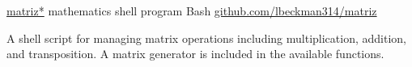 \showoff
{\href{https://liambeckman.com/code/matriz}{matriz*}}
{mathematics shell program}
{Bash}
{\href{https://github.com/lbeckman314/matriz}{github.com/lbeckman314/matriz}}

A shell script for managing matrix operations including multiplication, addition, and transposition. A matrix generator is included in the available functions.

\myBreak
